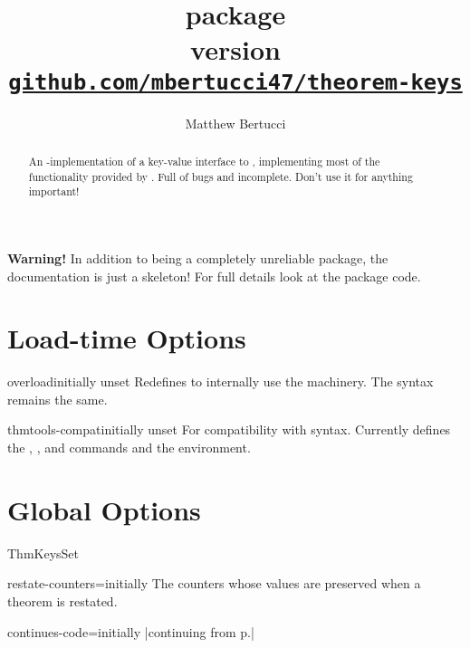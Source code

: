 \documentclass{ltxdoc}
\title{
	\pkg{theorem-keys} package \\[1ex]
	\large version \version \\[1ex]
	\href{https://github.com/mbertucci47/theorem-keys}
	  {\texttt{github.com/mbertucci47/theorem-keys}}
	}
\author{Matthew Bertucci}
\newcommand{\ttbraces}[1]{\braces{\texttt{#1}}}
\begin{document}
\maketitle

\begin{abstract}
An -implementation of a key-value interface to , implementing most of the functionality provided by . Full of bugs and incomplete. Don't use it for anything important!
\end{abstract}

\begin{tcolorbox}[colframe=red,colback=red!10!white]
\textbf{Warning!} In addition to being a completely unreliable package, the documentation is just a skeleton! For full details look at the package code.
\end{tcolorbox}

\section{Load-time Options}

\begin{docKey}{overload}{}{initially unset}
Redefines  to internally use the  machinery. The syntax remains the same.
\end{docKey}

\begin{docKey}{thmtools-compat}{}{initially unset}
For compatibility with  syntax. Currently defines the , , and  commands and the  environment. 
\end{docKey}

\section{Global Options}

\begin{docCommand}{ThmKeysSet}{}

\end{docCommand}

\begin{docKey}{restate-counters}{=}{initially \ttbraces{equation}}
The counters whose values are preserved when a theorem is restated.
\end{docKey}

\begin{docKey}{continues-code}{=}{initially |continuing from p.\cs{,}\ttbraces{\#1}|}

\end{docKey}
\end{document}
